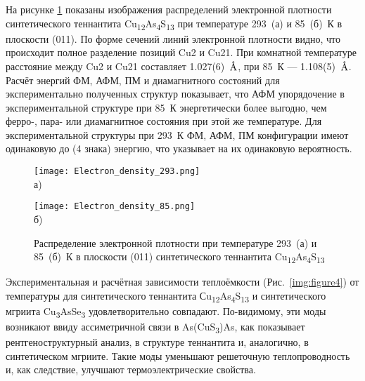 На рисунке \ref{img:xray2} показаны изображения распределений электронной плотности синтетического теннантита Cu\textsubscript{12}As\textsubscript{4}S\textsubscript{13} при температуре 293~(а) и 85~(б)~К в плоскости (011).
По форме сечений линий электронной плотности видно, что происходит полное разделение позиций Cu2 и Cu21.
При комнатной температуре расстояние между Cu2 и Cu21 составляет 1.027(6)~$\mbox{\normalfont\AA}$, при 85~К --- 1.108(5)~$\mbox{\normalfont\AA}$.
Расчёт энергий ФМ, АФМ, ПМ и диамагнитного состояний для экспериментально полученных структур показывает, что АФМ упорядочение в экспериментальной структуре при 85~К энергетически более выгодно, чем ферро-, пара- или диамагнитное состояния при этой же температуре.
Для экспериментальной структуры при 293~К ФМ, АФМ, ПМ конфигурации имеют одинаковую до (4 знака) энергию, что указывает на их одинаковую вероятность.

\begin{figure}[ht]
  \begin{minipage}[ht]{0.5\linewidth}\centering
    \texttt{[image: Electron\_density\_293.png]} \\ а)
  \end{minipage}
  \hfill
  \begin{minipage}[ht]{0.5\linewidth}\centering
    \texttt{[image: Electron\_density\_85.png]} \\ б)
  \end{minipage}

      \caption[Распределение электронной плотности при температуре 293~(а) и 85~(б)~К в плоскости (011) синтетического теннантита Cu\textsubscript{12}As\textsubscript{4}S\textsubscript{13}]{Распределение электронной плотности при температуре 293~(а) и 85~(б)~К в плоскости (011) синтетического теннантита Cu\textsubscript{12}As\textsubscript{4}S\textsubscript{13}}
    \label{img:xray2}
\end{figure}

Экспериментальная и расчётная зависимости теплоёмкости (Рис.~\ref{img:figure4}) от температуры для синтетического теннантита Сu\textsubscript{12}As\textsubscript{4}S\textsubscript{13} и  синтетического мгриита Cu\textsubscript{3}AsSe\textsubscript{3} удовлетворительно совпадают.
По-видимому, эти моды возникают ввиду ассиметричной связи в As(CuS\textsubscript{3})As, как показывает рентгеноструктурный анализ, в структуре теннантита и, аналогично, в синтетическом мгриите. Такие моды уменьшают решеточную теплопроводность и, как следствие, улучшают термоэлектрические свойства.

